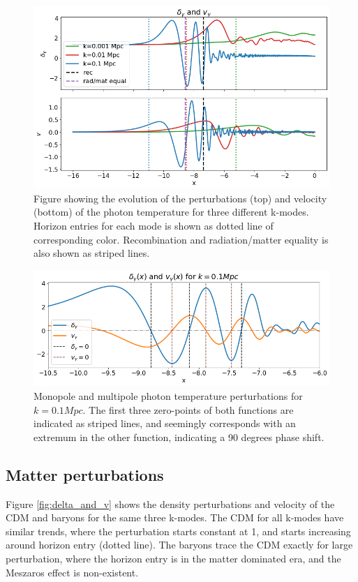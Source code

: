 \documentclass[10pt, a4paper]{article}
\begin{document}
\begin{figure}[H]
    \centering
    \includegraphics[scale=0.45]{../m3_figs/thetas.png}
    \caption{Figure showing the evolution of the perturbations (top) and velocity (bottom) of the photon temperature for three different k-modes. Horizon entries for each mode is shown as dotted line of corresponding color. Recombination and radiation/matter equality is also shown as striped lines.}
    \label{fig:Thetas}
\end{figure}

\begin{figure}[H]
    \centering
    \includegraphics[scale=0.45]{../m3_figs/Theta0_zoomed.png}
    \caption{Monopole and multipole photon temperature perturbations for $k=0.1 Mpc$. The first three zero-points of both functions are indicated as striped lines, and seemingly corresponds with an extremum in the other function, indicating a 90 degrees phase shift.}
    \label{fig:Thetas_zoomed}
\end{figure}


\subsection{Matter perturbations}
Figure \ref{fig:delta_and_v} shows the density perturbations and velocity of the CDM and baryons for the same three k-modes. The CDM for all k-modes have similar trends, where the perturbation starts constant at 1, and starts increasing around horizon entry (dotted line). The baryons trace the CDM exactly for large perturbation, where the horizon entry is in the matter dominated era, and the Meszaros effect is non-existent.
\end{document}
